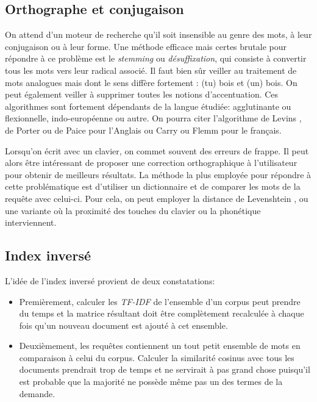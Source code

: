 \subsection{Orthographe et conjugaison}

On attend d'un moteur de recherche qu'il soit insensible au genre des mots, à leur conjugaison ou à leur forme. Une méthode efficace mais certes brutale pour répondre à ce problème est le \textit{stemming} ou \textit{désuffixation}, qui consiste à convertir tous les mots vers leur radical associé. Il faut bien sûr veiller au traitement de mots analogues mais dont le sens diffère fortement : (tu) bois et (un) bois. On peut également veiller à supprimer toutes les notions d'accentuation. Ces algorithmes sont fortement dépendants de la langue étudiée: agglutinante ou flexionnelle, indo-européenne ou autre. On pourra citer l'algorithme de Levins \cite{lovins1968development}, de Porter \cite{doi:10.1108/eb046814} ou de Paice \cite{Paice:1996:MES:230789.230796} pour l'Anglais ou Carry \cite{paternostre2002carry} ou Flemm \cite{namer2000flemm} pour le français.

Lorsqu'on écrit avec un clavier, on commet souvent des erreurs de frappe. Il peut alors être intéressant de proposer une correction orthographique à l'utilisateur pour obtenir de meilleurs résultats. La méthode la plus employée pour répondre à cette problématique est d'utiliser un dictionnaire et de comparer les mots de la requête avec celui-ci. Pour cela, on peut employer la distance de Levenshtein \cite{1966SPhD...10..707L}, ou une variante où la proximité des touches du clavier ou la phonétique interviennent.

\subsection{Index inversé} \label{subsubsection:Index inversé}

L'idée de l'index inversé provient de deux constatations:
\begin{itemize}
  \item Premièrement, calculer les \textit{TF-IDF} de l'ensemble d'un corpus peut prendre du temps et la matrice résultant doit être complètement recalculée à chaque fois qu'un nouveau document est ajouté à cet ensemble.
  \item Deuxièmement, les requêtes contiennent un tout petit ensemble de mots en comparaison à celui du corpus. Calculer la similarité cosinus avec tous les documents prendrait trop de temps et ne servirait à pas grand chose puisqu'il est probable que la majorité ne possède même pas un des termes de la demande.
\end{itemize}

